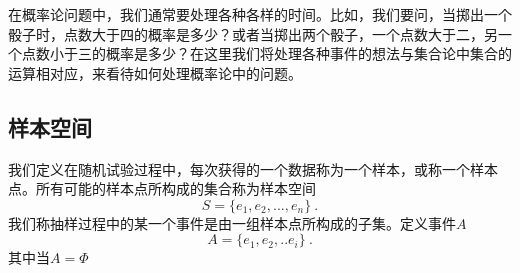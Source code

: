 在概率论问题中，我们通常要处理各种各样的时间。比如，我们要问，当掷出一个骰子时，点数大于四的概率是多少？或者当掷出两个骰子，一个点数大于二，另一个点数小于三的概率是多少？在这里我们将处理各种事件的想法与集合论中集合的运算相对应，来看待如何处理概率论中的问题。
\subsection{样本空间}
我们定义在随机试验过程中，每次获得的一个数据称为一个样本，或称一个样本点。所有可能的样本点所构成的集合称为样本空间
\begin{equation}
S = \{e_1,e_2,...,e_n\}~.
\end{equation}
我们称抽样过程中的某一个事件是由一组样本点所构成的子集。定义事件$A$
\begin{equation}
A = \{e_1,e_2,..e_i\}~.
\end{equation}
其中当$A=\Phi$

